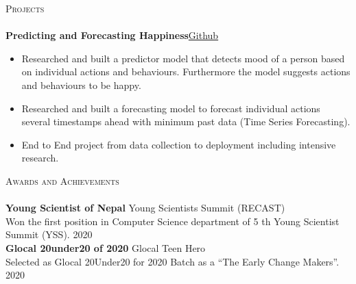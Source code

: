 \documentclass[a4paper]{article}
\newcommand{\lineunder} {
    \vspace*{-8pt} \\
    \hspace*{-18pt} \hrulefill \\
}
\newcommand{\header} [1] {
    {\hspace*{-18pt}\vspace*{6pt} \textsc{#1}}
    \vspace*{-6pt} \lineunder
}
\begin{document}
\header{Projects}
{\textbf{Predicting and Forecasting Happiness}}\hfill \href{https://github.com/amit-timalsina/Predicting-and-Forecasting-Happiness}{Github}
\vspace{-1mm}
\begin{itemize} \itemsep 0pt
    \item Researched and built a predictor model that detects mood of a person based on individual actions and behaviours. Furthermore the model suggests actions and behaviours to be happy. 
    \item Researched and built a forecasting model to forecast individual actions several timestamps ahead with minimum past data (Time Series Forecasting).
    \item End to End project from data collection to deployment including intensive research.
\end{itemize}
\vspace*{2mm}

\header{Awards and Achievements}
\textbf{Young Scientist of Nepal} \hfill Young Scientists Summit (RECAST)\\
Won the first position in Computer Science department of 5 th Young Scientist Summit (YSS). \hfill 2020\\
\vspace*{2mm}
\textbf{Glocal 20under20 of 2020} \hfill Glocal Teen Hero\\
Selected as Glocal 20Under20 for 2020 Batch as a “The Early Change Makers”. \hfill 2020\\
\vspace*{2mm}

\ 
\end{document}
